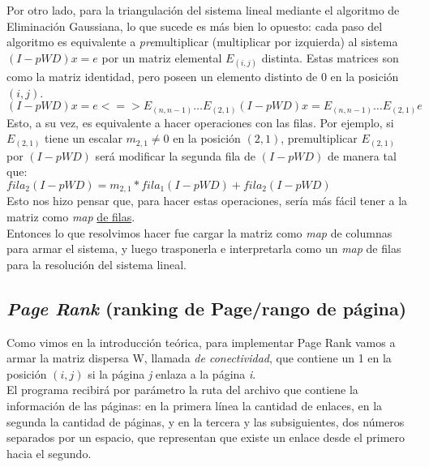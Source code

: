 		Por otro lado, para la triangulación del sistema lineal mediante el algoritmo de Eliminación Gaussiana, lo que sucede es más bien lo opuesto: cada paso del algoritmo es equivalente a \textit{pre}multiplicar (multiplicar por izquierda) al sistema $(I - pWD) x = e$ por un matriz elemental $E_{(i,j)}$ distinta. Estas matrices son como la matriz identidad, pero poseen un elemento distinto de $0$ en la posición $(i,j)$. \\

		$ (I - pWD) x = e <=> E_{(n,n-1)} \hdots E_{(2,1)} (I - pWD) x = E_{(n,n-1)} \hdots E_{(2,1)} e $ \\

		Esto, a su vez, es equivalente a hacer operaciones con las filas. Por ejemplo, si $E_{(2,1)}$ tiene un escalar $m_{2,1} \neq 0$ en la posición $(2,1)$, premultiplicar $E_{(2,1)}$ por $(I - pWD)$ será modificar la segunda fila de $(I - pWD)$ de manera tal que: \\

		$fila_{2}(I-pWD) = m_{2,1} *  fila_{1}(I-pWD) + fila_{2}(I-pWD)$ \\

		Esto nos hizo pensar que, para hacer estas operaciones, sería más fácil tener a la matriz como \textit{map} \underline{de filas}. \\

		Entonces lo que resolvimos hacer fue cargar la matriz como \textit{map} de columnas para armar el sistema, y luego trasponerla e interpretarla como un \textit{map} de filas para la resolución del sistema lineal. \\

	\subsection{\textit{Page Rank} (ranking de Page/rango de página)}

		Como vimos en la introducción teórica, para implementar Page Rank vamos a armar la matriz dispersa W, llamada \textit{de conectividad}, que contiene un 1 en la posición $(i,j)$ si la página \textit{j} enlaza a la página \textit{i}. \\

		El programa recibirá por parámetro la ruta del archivo que contiene la información de las páginas: en la primera línea la cantidad de enlaces, en la segunda la cantidad de páginas, y en la tercera y las subsiguientes, dos números separados por un espacio, que representan que existe un enlace desde el primero hacia el segundo. \\

